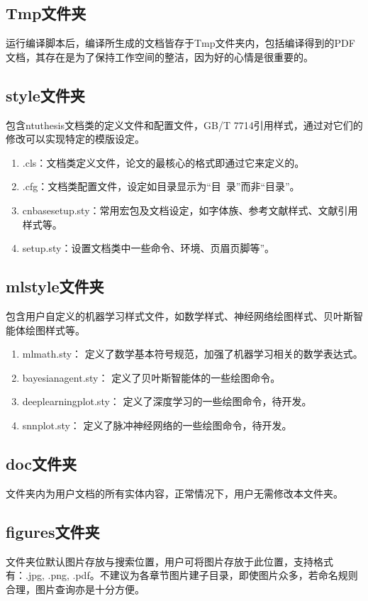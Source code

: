 \subsection{Tmp文件夹}

运行编译脚本后，编译所生成的文档皆存于Tmp文件夹内，包括编译得到的PDF文档，其存在是为了保持工作空间的整洁，因为好的心情是很重要的。

\subsection{style文件夹}

包含ntuthesis文档类的定义文件和配置文件，GB/T 7714引用样式，通过对它们的修改可以实现特定的模版设定。

\begin{enumerate}
    \item \projectname.cls：文档类定义文件，论文的最核心的格式即通过它来定义的。
    \item \projectname.cfg：文档类配置文件，设定如目录显示为“目~录”而非“目录”。
    \item cnbasesetup.sty：常用宏包及文档设定，如字体族、参考文献样式、文献引用样式等。
    \item \projectname setup.sty：设置文档类中一些命令、环境、页眉页脚等”。
\end{enumerate}

\subsection{mlstyle文件夹}
包含用户自定义的机器学习样式文件，如数学样式、神经网络绘图样式、贝叶斯智能体绘图样式等。
\begin{enumerate}
    \item mlmath.sty： 定义了数学基本符号规范，加强了机器学习相关的数学表达式。
    \item bayesianagent.sty： 定义了贝叶斯智能体的一些绘图命令。
    \item deeplearningplot.sty： 定义了深度学习的一些绘图命令，待开发。
    \item snnplot.sty： 定义了脉冲神经网络的一些绘图命令，待开发。
\end{enumerate}

\subsection{doc文件夹}
文件夹内为用户文档的所有实体内容，正常情况下，用户无需修改本文件夹。


\subsection{figures文件夹}
文件夹位默认图片存放与搜索位置，用户可将图片存放于此位置，支持格式有：.jpg, .png, .pdf。不建议为各章节图片建子目录，即使图片众多，若命名规则合理，图片查询亦是十分方便。

